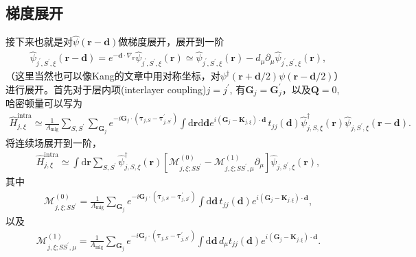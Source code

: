 \documentclass[10pt, oneside]{article}
\begin{document}
\subsection{梯度展开}
接下来也就是对\(\hat{\psi}\left(\bm{r} - \bm{d }\right)\)做梯度展开，展开到一阶
\begin{align}
	\hat{\psi}_{j^{\prime}, S^{\prime}, \xi} \left(\bm{r} - \bm{d}\right) = e^{-\bm{d } \cdot \nabla_{\bm{r}}} \hat{\psi}_{j^{\prime}, S^{\prime}, \xi} \left(\bm{r}\right) \simeq  \hat{\psi}_{j^{\prime}, S^{\prime}, \xi} \left(\bm{r}\right)  - d_{\mu} \partial_{\mu}  \hat{\psi}_{j^{\prime}, S^{\prime}, \xi} \left(\bm{r}\right),
\end{align}
（这里当然也可以像Kang的文章中用对称坐标，对\(\psi^{\dagger} \left(\bm{r} + \bm{d}/2\right) \psi \left(\bm{r} - \bm{d}/2\right)\)）进行展开。首先对于层内项(interlayer coupling)\(j = j^{\prime}\), 有\(\bm{G}_{j} = \bm{G}^{\prime}_{j}\)，以及\(\bm{Q } = 0\), 哈密顿量可以写为
\begin{align}
	\hat{H}^{\mathrm{intra}}_{j,\xi} \simeq \frac{1}{A_\mathrm{mlg}} \sum_{S,S^{\prime}} \sum_{\bm{G}_{j}} e^{-i \bm{G}_{j} \cdot \left( \bm{\tau}_{j,S } - \bm{\tau}^{\prime}_{j, S^{\prime}}\right)} \int \mathrm{d} \bm{r} \mathrm{d} \bm{d} e^{i \left(\bm{G}_{j} - \bm{K }_{j,\xi}\right) \cdot \bm{d }} \, t_{jj} \left(\bm{d }\right) \hat{\psi}^{\dagger}_{j, S, \xi} \left(\bm{r}\right) \hat{\psi}_{j,S^{\prime}, \xi} \left(\bm{r} - \bm{d }\right).
\end{align}
将连续场展开到一阶，
\begin{align}
	\hat{H}^{\mathrm{intra}}_{j,\xi} \simeq \int \mathrm{d} \bm{r} \sum_{S,S^{\prime}} \hat{\psi}^{\dagger}_{j, S, \xi} \left(\bm{r}\right) \left[\mathcal{M }^{\left(0\right)}_{j,\xi;SS^{\prime}} - \mathcal{M }^{\left(1\right)}_{j,\xi;SS^{\prime}, \mu} \partial_{\mu}\right] \hat{\psi}_{j,S^{\prime},\xi} \left(\bm{r}\right),
\end{align}
其中
\begin{align}
	\mathcal{M }^{\left(0\right)}_{j,\xi;SS^{\prime}} = \frac{1}{A_{\mathrm{mlg}}} \sum_{\bm{G}_{j}}  e^{-i \bm{G}_{j} \cdot \left( \bm{\tau}_{j,S } - \bm{\tau}^{\prime}_{j, S^{\prime}}\right)} \int \mathrm{d} \bm{d} \, t_{jj} \left(\bm{d }\right) e^{i \left(\bm{G}_{j} - \bm{K }_{j,\xi}\right) \cdot \bm{d }},
\end{align}
以及
\begin{align}
	\mathcal{M }^{\left(1\right)}_{j,\xi;SS^{\prime}, \mu}  = \frac{1}{A_{\mathrm{mlg}}} \sum_{\bm{G}_{j}}  e^{-i \bm{G}_{j} \cdot \left( \bm{\tau}_{j,S } - \bm{\tau}^{\prime}_{j, S^{\prime}}\right)} \int \mathrm{d} \bm{d} \, d_{\mu} t_{jj} \left(\bm{d }\right) e^{i \left(\bm{G}_{j} - \bm{K }_{j,\xi}\right) \cdot \bm{d }}.
\end{align}
\end{document}
